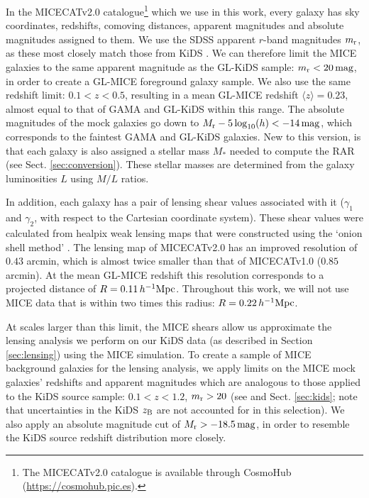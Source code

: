 \documentclass[usenatbib]{mnras}
\newcommand{\hMpc}{\, h^{-1}{\rm{Mpc}} }
\newcommand{\magn}{\, {\rm mag} }
\newcommand*{\meanb}[1]{\langle{#1}\rangle}
\newcommand{\un}[1]{_{\rm #1}}
\begin{document}
In the MICECATv2.0 catalogue\footnote{The MICECATv2.0 catalogue is available through CosmoHub (\url{https://cosmohub.pic.es}).} which we use in this work, every galaxy has sky coordinates, redshifts, comoving distances, apparent magnitudes and absolute magnitudes assigned to them. We use the SDSS apparent $r$-band magnitudes $m\un{r}$, as these most closely match those from KiDS \cite[see][]{brouwer2018}. We can therefore limit the MICE galaxies to the same apparent magnitude as the GL-KiDS sample: $m\un{r}<20 \, {\rm mag}$, in order to create a GL-MICE foreground galaxy sample. We also use the same redshift limit: $0.1<z<0.5$, resulting in a mean GL-MICE redshift $\meanb{z}=0.23$, almost equal to that of GAMA and GL-KiDS within this range. The absolute magnitudes of the mock galaxies go down to $M\un{r} - 5\log_{10}(h) < -14 \magn$, which corresponds to the faintest GAMA and GL-KiDS galaxies. New to this version, is that each galaxy is also assigned a stellar mass $M_*$ needed to compute the RAR (see Sect. \ref{sec:conversion}). These stellar masses are determined from the galaxy luminosities $L$ using \cite{bell2001} $M/L$ ratios.

In addition, each galaxy has a pair of lensing shear values associated with it ($\gamma_1$ and $\gamma_2$, with respect to the Cartesian coordinate system). These shear values were calculated from healpix weak lensing maps that were constructed using the `onion shell method' \cite[]{fosalba2008, fosalba2015a}. The lensing map of MICECATv2.0 has an improved resolution of $0.43$ arcmin, which is almost twice smaller than that of MICECATv1.0 ($0.85$ arcmin). At the mean GL-MICE redshift this resolution corresponds to a projected distance of $R=0.11 \hMpc$. Throughout this work, we will not use MICE data that is within two times this radius: $R=0.22 \hMpc$.

At scales larger than this limit, the MICE shears allow us approximate the lensing analysis we perform on our KiDS data (as described in Section \ref{sec:lensing}) using the MICE simulation. To create a sample of MICE background galaxies for the lensing analysis, we apply limits on the MICE mock galaxies' redshifts and apparent magnitudes which are analogous to those applied to the KiDS source sample: $0.1 < z < 1.2$, $m\un{r}>20$ (see \citealp{hildebrandt2017} and Sect. \ref{sec:kids}; note that uncertainties in the KiDS $z\un{B}$ are not accounted for in this selection). We also apply an absolute magnitude cut of $M\un{r}>-18.5 \, {\rm mag}$, in order to resemble the KiDS source redshift distribution more closely.
\end{document}
